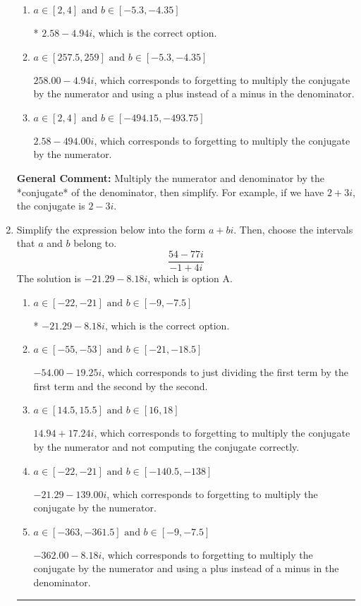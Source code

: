 \documentclass{extbook}[14pt]
\newcommand{\litem}[1]{\item #1

\rule{\textwidth}{0.4pt}}
\begin{document}
\begin{enumerate}
{\begin{enumerate}[label=\Alph*.]
 $-4.02  - 3.86 i$, which corresponds to forgetting to multiply the conjugate by the numerator and not computing the conjugate correctly.
\item \( a \in [2, 4] \text{ and } b \in [-5.3, -4.35] \)

* $2.58  - 4.94 i$, which is the correct option.
\item \( a \in [257.5, 259] \text{ and } b \in [-5.3, -4.35] \)

 $258.00  - 4.94 i$, which corresponds to forgetting to multiply the conjugate by the numerator and using a plus instead of a minus in the denominator.
\item \( a \in [2, 4] \text{ and } b \in [-494.15, -493.75] \)

 $2.58  - 494.00 i$, which corresponds to forgetting to multiply the conjugate by the numerator.
\end{enumerate}

\textbf{General Comment:} Multiply the numerator and denominator by the *conjugate* of the denominator, then simplify. For example, if we have $2+3i$, the conjugate is $2-3i$.
}
\litem{
Simplify the expression below into the form $a+bi$. Then, choose the intervals that $a$ and $b$ belong to.
\[ \frac{54 - 77 i}{-1 + 4 i} \]The solution is \( -21.29  - 8.18 i \), which is option A.\begin{enumerate}[label=\Alph*.]
\item \( a \in [-22, -21] \text{ and } b \in [-9, -7.5] \)

* $-21.29  - 8.18 i$, which is the correct option.
\item \( a \in [-55, -53] \text{ and } b \in [-21, -18.5] \)

 $-54.00  - 19.25 i$, which corresponds to just dividing the first term by the first term and the second by the second.
\item \( a \in [14.5, 15.5] \text{ and } b \in [16, 18] \)

 $14.94  + 17.24 i$, which corresponds to forgetting to multiply the conjugate by the numerator and not computing the conjugate correctly.
\item \( a \in [-22, -21] \text{ and } b \in [-140.5, -138] \)

 $-21.29  - 139.00 i$, which corresponds to forgetting to multiply the conjugate by the numerator.
\item \( a \in [-363, -361.5] \text{ and } b \in [-9, -7.5] \)

 $-362.00  - 8.18 i$, which corresponds to forgetting to multiply the conjugate by the numerator and using a plus instead of a minus in the denominator.
\end{enumerate}

}
\end{enumerate}
\end{document}
